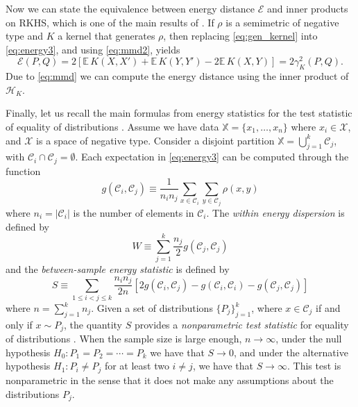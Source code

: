 \documentclass[aps,preprint,nofootinbib,floatfix]{revtex4-1}
\newcommand\Energy{\mathcal{E}}
\newcommand\E{\mathbb{E}}
\newcommand\kk{K}
\newcommand\Hk{{\mathcal{H}}_{\kk}}
\newcommand\C{{\mathcal{C}}}
\begin{document}
Now we can state the equivalence between energy distance $\Energy$ and
inner products on RKHS, which is one of the main results of
\cite{Sejdinovic2013}. If $\rho$ is a semimetric
of negative type and $\kk$ a kernel that generates $\rho$, then
replacing \eqref{eq:gen_kernel} into
\eqref{eq:energy3}, and using \eqref{eq:mmd2}, yields
\begin{equation} \label{eq:Erho}
\Energy(P, Q) = 
2 \left[ \E \, \kk(X, X') + \E \, \kk(Y, Y') - 2\E \, \kk(X, Y)\right] 
= 2 \gamma_\kk^2(P,Q) .
\end{equation}
Due to \eqref{eq:mmd} we can compute the energy distance using the inner 
product of $\Hk$. 

Finally, let us recall the main formulas from energy statistics
for the test statistic of equality of distributions \cite{Szkely2013}. 
Assume we have data $\mathbb{X} = \{ x_1,\dotsc, x_n \}$ where
$x_i \in \mathcal{X}$, and $\mathcal{X}$ is a space of negative type.
Consider a disjoint partition $\mathbb{X} = \bigcup_{j=1}^k \C_j$, with
$\C_i \cap \C_j = \emptyset$.
Each expectation in 
\eqref{eq:energy3}
can be computed 
through the function
\begin{equation}
\label{eq:g_def}
g (\C_i, \C_j) \equiv 
\dfrac{1}{n_i n_j}
\sum_{x \in \C_i} 
\sum_{y \in \C_j} \rho(x, y)
\end{equation}
where $n_i = |\C_i|$ is the number of elements in 
$\C_i$. 
The \emph{within energy dispersion} is defined by
\begin{equation}
\label{eq:within}
W \equiv
\sum_{j=1}^{k} \dfrac{n_j}{2} g(\C_j, \C_j)
\end{equation}
and the \emph{between-sample energy statistic} is defined by
\begin{equation}
\label{eq:between}
S \equiv
\sum_{1 \le  i < j \le k } \dfrac{n_i n_{j}}{2 n} \left[
2 g(\C_i, \C_j) - 
g(\C_i, \C_i) - 
g(\C_j, \C_j)
\right]
\end{equation}
where $n = \sum_{j=1}^k n_j$.
Given a set of distributions
$\{ P_j\}_{j=1}^k$, where $x \in \C_j$ if and only if $x \sim P_j$, 
the quantity $S$ provides
a \emph{nonparametric test statistic} for equality of distributions
\cite{Szkely2013}.
When the sample size is large enough, $n\to \infty$,
under the null hypothesis $H_0: P_1=P_2=\dotsm=P_k$ we have that
$S\to 0$, 
and under
the alternative hypothesis $H_1: P_i \ne P_j$ for at least two $i\ne j$, 
we have that $S \to \infty$.
This test is nonparametric in the sense that it does not make any assumptions
about the distributions $P_j$.
\end{document}
